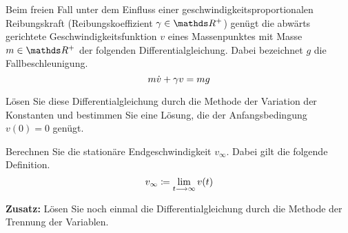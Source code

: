 \begin{atiTask}[
  title = Freier Fall mit Reibung
]
 Beim freien Fall unter dem Einfluss einer geschwindigkeitsproportionalen Reibungskraft (Reibungskoeffizient $\gamma\in\setR^+$) genügt die abwärts gerichtete Geschwindigkeitsfunktion $v$ eines Massenpunktes mit Masse $m\in\setR^+$ der folgenden Differentialgleichung.
 Dabei bezeichnet $g$ die Fallbeschleunigung.
 \[
   m\dot{v} + \gamma v = mg
 \]
 \begin{atiSubtasks}
   \item{
    Lösen Sie diese Differentialgleichung durch die Methode der Variation der Konstanten und bestimmen Sie eine Lösung, die der Anfangsbedingung $v(0)=0$ genügt.
  }
  \item{
    Berechnen Sie die stationäre Endgeschwindigkeit $v_\infty$.
    Dabei gilt die folgende Definition.
    \[
      v_\infty \define \lim_{t\conv\infty}v(t)
    \]
  }
  \item{
    \textbf{Zusatz:}
    Lösen Sie noch einmal die Differentialgleichung durch die Methode der Trennung der Variablen.
  }
 \end{atiSubtasks}
\end{atiTask}